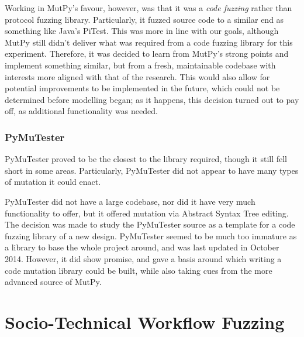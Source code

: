 \documentclass[11pt, twocolumn]{article}
\begin{document}
Working in MutPy's favour, however, was that it was a \emph{code fuzzing} rather than protocol fuzzing library. Particularly, it fuzzed source code to a similar end as something like Java's PiTest\cite{PITMu92:online}. This was more in line with our goals, although MutPy still didn't deliver what was required from a code fuzzing library for this experiment. Therefore, it was decided to learn from MutPy's strong points and implement something similar, but from a fresh, maintainable codebase with interests more aligned with that of the research. This would also allow for potential improvements to be implemented in the future, which could not be determined before modelling began; as it happens, this decision turned out to pay off, as additional functionality was needed. \par

\subsubsection{PyMuTester}
\label{fuzzing_pymutester}
PyMuTester\cite{GitHu12:online} proved to be the closest to the library required, though it still fell short in some areas. Particularly, PyMuTester did not appear to have many types of mutation it could enact. \par
PyMuTester did not have a large codebase\cite{GitHu12:online}, nor did it have very much functionality to offer, but it offered mutation via Abstract Syntax Tree editing. The decision was made to study the PyMuTester source as a template for a code fuzzing library of a new design. PyMuTester seemed to be much too immature as a library to base the whole project around, and was last updated in October 2014. However, it did show promise, and gave a basis around which writing a code mutation library could be built, while also taking cues from the more advanced source of MutPy\cite{khala8:online}.  \par%



\section{Socio-Technical Workflow Fuzzing}

\end{document}
